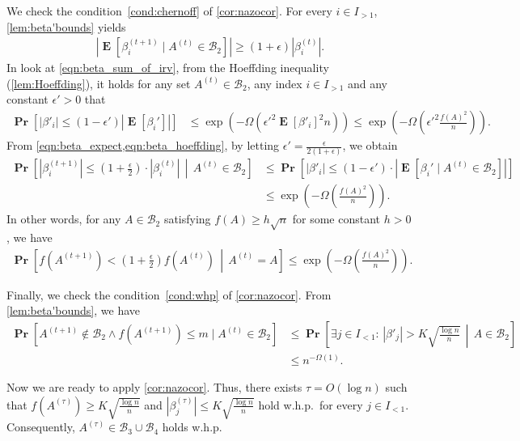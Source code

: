 \documentclass[letterpaper,11pt]{article}
\renewcommand\Pr{\mathop{\mathbf{Pr}}}
\DeclareMathOperator{\E}{\mathbf{E}}
\begin{document}
We check the condition~\ref{cond:chernoff} of \cref{cor:nazocor}.
For every $i\in I_{>1}$, \cref{lem:beta'bounds} yields
\begin{align}
|\E[\beta^{(t+1)}_i \mid A^{(t)}\in\mathcal{B}_2]| \geq (1+\epsilon) |\beta^{(t)}_i|. \label{eqn:beta_expect}
\end{align}
In look at \cref{eqn:beta_sum_of_irv}, from the Hoeffding inequality (\cref{lem:Hoeffding}), it holds for any set $A^{(t)}\in\mathcal{B}_2$, any index $i\in I_{>1}$ and any constant $\epsilon'>0$ that
\begin{align}
\Pr[|\beta'_i| \leq (1-\epsilon')|\E[\beta_i']|]&\leq \exp\left(-\Omega\left(\epsilon'^2\E[\beta'_i]^2n\right)\right)
\leq \exp\left(-\Omega\left(\epsilon'^2\frac{f(A)^2}{n}\right)\right). \label{eqn:beta_hoeffding}
\end{align}
From \cref{eqn:beta_expect,eqn:beta_hoeffding}, by letting $\epsilon'=\frac{\epsilon}{2(1+\epsilon)}$, we obtain
\begin{align*}
\Pr\left[|\beta^{(t+1)}_i| \leq \left(1+\frac{\epsilon}{2}\right)\cdot |\beta^{(t)}_i| \,\middle|\,A^{(t)}\in \mathcal{B}_2\right] 
&\leq \Pr\left[|\beta'_i| \leq (1-\epsilon') \cdot |\E[\beta_i'  \mid A^{(t)}\in\mathcal{B}_2] |\right]\\
&\leq \exp\left(-\Omega\left(\frac{f(A)^2}{n}\right)\right). 
\end{align*}
In other words, for any $A\in\mathcal{B}_2$ satisfying $f(A)\geq h\sqrt{n}$ for some constant $h>0$, we have
\begin{align*}
\Pr\left[f(A^{(t+1)})<\left(1+\frac{\epsilon}{2}\right)f(A^{(t)})\,\middle|\,A^{(t)}=A \right]\leq \exp\left(-\Omega\left(\frac{f(A)^2}{n}\right)\right).
\end{align*}

Finally, we check the condition~\ref{cond:whp} of \cref{cor:nazocor}.
From \cref{lem:beta'bounds}, we have
\begin{align*}
\Pr[A^{(t+1)}\not\in \mathcal{B}_2 \land f(A^{(t+1)})\leq m \mid A^{(t)}\in\mathcal{B}_2]
&\leq \Pr\left[\exists j\in I_{<1}:\,|\beta'_j|> K\sqrt{\frac{\log n}{n}}\,\middle|\,A\in\mathcal{B}_2\right] \\
&\leq n^{-\Omega(1)}.
\end{align*}

Now we are ready to apply \cref{cor:nazocor}.
Thus, there exists $\tau=O(\log n)$ such that $f(A^{(\tau)})\geq K\sqrt{\frac{\log n}{n}}$ and $|\beta^{(\tau)}_j| \leq K\sqrt{\frac{\log n}{n}}$ hold w.h.p.~for every $j\in I_{<1}$.
Consequently, $A^{(\tau)}\in \mathcal{B}_3 \cup \mathcal{B}_4$ holds w.h.p.
\end{document}
